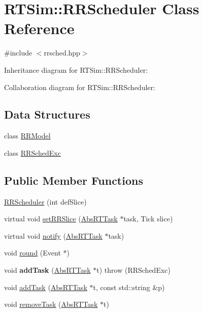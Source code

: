 \hypertarget{classRTSim_1_1RRScheduler}{}\section{R\+T\+Sim\+:\+:R\+R\+Scheduler Class Reference}
\label{classRTSim_1_1RRScheduler}


{\ttfamily \#include $<$rrsched.\+hpp$>$}



Inheritance diagram for R\+T\+Sim\+:\+:R\+R\+Scheduler\+:


Collaboration diagram for R\+T\+Sim\+:\+:R\+R\+Scheduler\+:
\subsection*{Data Structures}
\begin{DoxyCompactItemize}
\item 
class \hyperlink{classRTSim_1_1RRScheduler_1_1RRModel}{R\+R\+Model}
\item 
class \hyperlink{classRTSim_1_1RRScheduler_1_1RRSchedExc}{R\+R\+Sched\+Exc}
\end{DoxyCompactItemize}
\subsection*{Public Member Functions}
\begin{DoxyCompactItemize}
\item 
\hyperlink{classRTSim_1_1RRScheduler_af3b55a2c19393c18d344e3f447a90bd0}{R\+R\+Scheduler} (int def\+Slice)
\item 
virtual void \hyperlink{classRTSim_1_1RRScheduler_ab6ffc760e2009ec6401da96090c3ccc0}{set\+R\+R\+Slice} (\hyperlink{classRTSim_1_1AbsRTTask}{Abs\+R\+T\+Task} $\ast$task, Tick slice)
\item 
virtual void \hyperlink{classRTSim_1_1RRScheduler_a5de59f00d6c1d4771e222694abfe7fd8}{notify} (\hyperlink{classRTSim_1_1AbsRTTask}{Abs\+R\+T\+Task} $\ast$task)
\item 
void \hyperlink{classRTSim_1_1RRScheduler_a3f3c820f4e31b25cf6850c0ee4124f02}{round} (Event $\ast$)
\item 
void {\bfseries add\+Task} (\hyperlink{classRTSim_1_1AbsRTTask}{Abs\+R\+T\+Task} $\ast$t)  throw (\+R\+R\+Sched\+Exc)\hypertarget{classRTSim_1_1RRScheduler_a736a724ebf7b6d70f1922555ba123188}{}\label{classRTSim_1_1RRScheduler_a736a724ebf7b6d70f1922555ba123188}

\item 
void \hyperlink{classRTSim_1_1RRScheduler_ac197ead073a435097b397be246cfc3e0}{add\+Task} (\hyperlink{classRTSim_1_1AbsRTTask}{Abs\+R\+T\+Task} $\ast$t, const std\+::string \&p)
\item 
void \hyperlink{classRTSim_1_1RRScheduler_a6684034f73d9c191d67eede866fd25e2}{remove\+Task} (\hyperlink{classRTSim_1_1AbsRTTask}{Abs\+R\+T\+Task} $\ast$t)
\end{DoxyCompactItemize}
